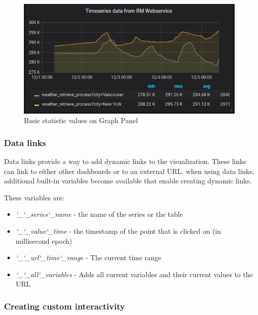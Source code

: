 \begin{figure}[H]
	\centering
	\includegraphics[width=130mm, keepaspectratio]{figures/basic-statistics.png}
	\caption{Basic statistic values on Graph Panel}
	\label{fig:basic-statistics}
\end{figure}

\subsubsection{Data links}

Data links provide a way to add dynamic links to the visualization. These links can link to either other dashboards or to an external URL. when using data links, additional built-in variables become available that enable creating dynamic links.

These variables are:
\begin{itemize}
	\item \emph{\char`_\char`_series\char`_name} - the name of the series or the table
	\item \emph{\char`_\char`_value\char`_time} - the timestamp of the point that is clicked on (in millisecond epoch)
	\item \emph{\char`_\char`_url\char`_time\char`_range} - The current time range
	\item \emph{\char`_\char`_all\char`_variables} - Adds all current variables and their current values to the URL
\end{itemize}

\subsubsection{Creating custom interactivity}

